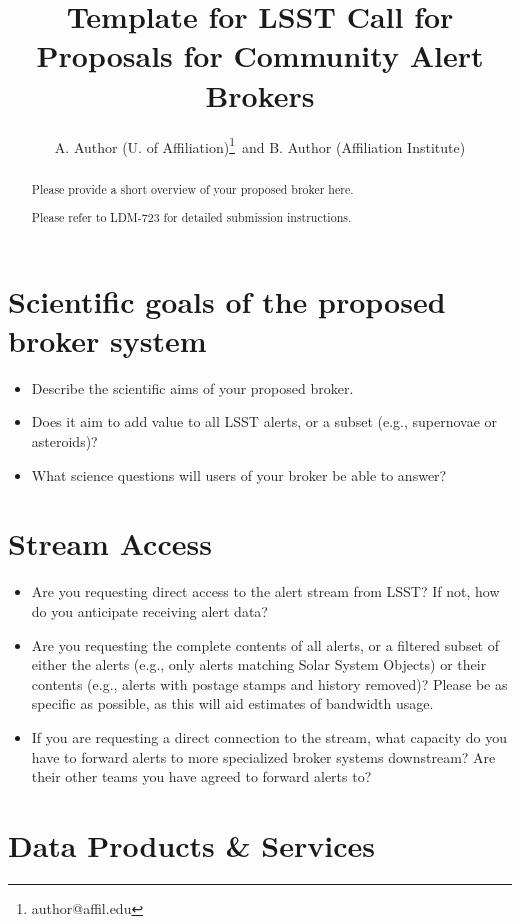 \documentclass[11pt, letterpaper]{article}
\title{Template for LSST Call for Proposals for Community Alert Brokers}
\author{A. Author (U. of Affiliation)\footnote{author@affil.edu}\ and B. Author (Affiliation Institute)}
\date{}
\begin{document}
\maketitle

\begin{abstract}
Please provide a short overview of your proposed broker here.

Please refer to LDM-723 for detailed submission instructions.
\end{abstract}


\section{Scientific goals of the proposed broker system}

\begin{itemize}
\item Describe the scientific aims of your proposed broker. 
\item Does it aim to add value to all LSST alerts, or a subset (e.g., supernovae or asteroids)?
\item What science questions will users of your broker be able to answer?
\end{itemize}

\section{Stream Access}

\begin{itemize}
\item Are you requesting direct access to the alert stream from LSST?  If not, how do you anticipate receiving alert data? 
\item Are you requesting the complete contents of all alerts, or a filtered subset of either the alerts (e.g., only alerts matching Solar System Objects) or their contents (e.g., alerts with postage stamps and history removed)?  Please be as specific as possible, as this will aid estimates of bandwidth usage.
\item If you are requesting a direct connection to the stream, what capacity do you have to forward alerts to more specialized broker systems downstream?  Are their other teams you have agreed to forward alerts to?
\end{itemize}

\section{Data Products \& Services}
\end{document}
